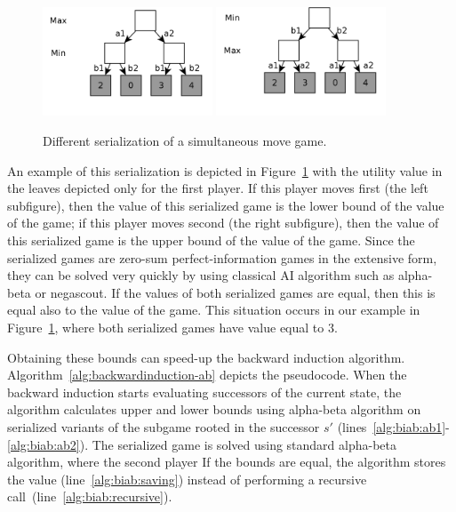\begin{figure}
\includegraphics[width=0.45\textwidth]{figures/serialization1-1.png}
\includegraphics[width=0.45\textwidth]{figures/serialization1-2.png}
\caption{Different serialization of a simultaneous move game.}\label{fig:serialization}
\end{figure}

An example of this serialization is depicted in Figure~\ref{fig:serialization} with the utility value in the leaves depicted only for the first player. 
If this player moves first (the left subfigure), then the value of this serialized game is the lower bound of the value of the game; if this player moves second (the right subfigure), then the value of this serialized game is the upper bound of the value of the game.
Since the serialized games are zero-sum perfect-information games in the extensive form, they can be solved very quickly by using classical AI algorithm such as alpha-beta or negascout.
If the values of both serialized games are equal, then this is equal also to the value of the game. This situation occurs in our example in Figure~\ref{fig:serialization}, where both serialized games have value equal to $3$.

Obtaining these bounds can speed-up the backward induction algorithm. 
Algorithm~\ref{alg:backwardinduction-ab} depicts the pseudocode.
When the backward induction starts evaluating successors of the current state, the algorithm calculates upper and lower bounds using alpha-beta algorithm on serialized variants of the subgame rooted in the successor $s'$ (lines~\ref{alg:biab:ab1}-\ref{alg:biab:ab2}). The serialized game is solved using standard alpha-beta algorithm, where the second player 
If the bounds are equal, the algorithm stores the value (line~\ref{alg:biab:saving}) instead of performing a recursive call~(line~\ref{alg:biab:recursive}).

